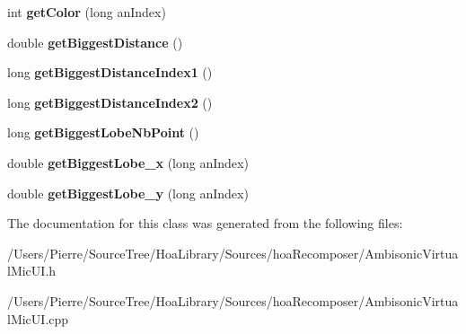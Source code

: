 \begin{DoxyCompactItemize}
\item 
\hypertarget{class_ambisonic_virtual_mic_u_i_a6f9e3f1fa51d12d69d0404980617b507}{int {\bfseries get\-Color} (long an\-Index)}\label{class_ambisonic_virtual_mic_u_i_a6f9e3f1fa51d12d69d0404980617b507}

\item 
\hypertarget{class_ambisonic_virtual_mic_u_i_a094f71f6460892ef9110191d5561ae49}{double {\bfseries get\-Biggest\-Distance} ()}\label{class_ambisonic_virtual_mic_u_i_a094f71f6460892ef9110191d5561ae49}

\item 
\hypertarget{class_ambisonic_virtual_mic_u_i_ae416ee2f93d29ab03421eaa48e93eae4}{long {\bfseries get\-Biggest\-Distance\-Index1} ()}\label{class_ambisonic_virtual_mic_u_i_ae416ee2f93d29ab03421eaa48e93eae4}

\item 
\hypertarget{class_ambisonic_virtual_mic_u_i_a281ec79aec2e13c4af2f24bfa230931f}{long {\bfseries get\-Biggest\-Distance\-Index2} ()}\label{class_ambisonic_virtual_mic_u_i_a281ec79aec2e13c4af2f24bfa230931f}

\item 
\hypertarget{class_ambisonic_virtual_mic_u_i_aea65615663521bc5427302a5787af7c0}{long {\bfseries get\-Biggest\-Lobe\-Nb\-Point} ()}\label{class_ambisonic_virtual_mic_u_i_aea65615663521bc5427302a5787af7c0}

\item 
\hypertarget{class_ambisonic_virtual_mic_u_i_ada5f19e349255e912c688ad825b54528}{double {\bfseries get\-Biggest\-Lobe\-\_\-x} (long an\-Index)}\label{class_ambisonic_virtual_mic_u_i_ada5f19e349255e912c688ad825b54528}

\item 
\hypertarget{class_ambisonic_virtual_mic_u_i_a42c9786b3864ed4d3c2bd52ad81c8069}{double {\bfseries get\-Biggest\-Lobe\-\_\-y} (long an\-Index)}\label{class_ambisonic_virtual_mic_u_i_a42c9786b3864ed4d3c2bd52ad81c8069}

\end{DoxyCompactItemize}


The documentation for this class was generated from the following files\-:\begin{DoxyCompactItemize}
\item 
/\-Users/\-Pierre/\-Source\-Tree/\-Hoa\-Library/\-Sources/hoa\-Recomposer/Ambisonic\-Virtual\-Mic\-U\-I.\-h\item 
/\-Users/\-Pierre/\-Source\-Tree/\-Hoa\-Library/\-Sources/hoa\-Recomposer/Ambisonic\-Virtual\-Mic\-U\-I.\-cpp\end{DoxyCompactItemize}
